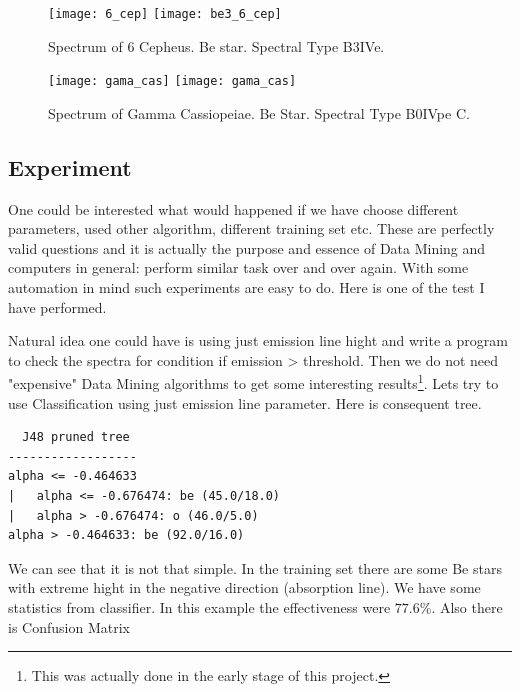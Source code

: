    \begin{figure}[!htbp]
      \begin{center}
        \leavevmode
        \ifpdf
        \texttt{[image: 6\_cep]}
        \else
        \texttt{[image: be3\_6\_cep]}
        \fi
        \caption{Spectrum of 6 Cepheus. Be star. Spectral Type B3IVe.}
        \label{FigBe3}
      \end{center}
    \end{figure}

  \begin{figure}[!htbp]
      \begin{center} 
        \leavevmode
        \ifpdf
        \texttt{[image: gama\_cas]}
        \else
        \texttt{[image: gama\_cas]}
        \fi     
        \caption{Spectrum of Gamma Cassiopeiae. Be Star. Spectral Type
          B0IVpe C.}
        \label{FigBe3}
      \end{center}
    \end{figure}



\clearpage

\subsection{Experiment}

One could be interested what would happened if we have choose
different parameters, used other algorithm, different training set
etc. These are perfectly valid questions and it is actually the purpose
and essence of Data Mining and computers in general: perform similar
task over and over again. With some automation in mind such
experiments are easy to do. Here is one of the test I have performed.

Natural idea one could have is using just emission line hight and
write a program to check the spectra for condition \textrm{if emission
  > threshold}. Then we do not need "expensive" Data Mining algorithms to
get some interesting results\footnote{This was actually done in the early
stage of this project.}. Lets try to use Classification using just
emission line parameter. Here is consequent tree.


\begin{lstlisting}
  J48 pruned tree
------------------
alpha <= -0.464633
|   alpha <= -0.676474: be (45.0/18.0)
|   alpha > -0.676474: o (46.0/5.0)
alpha > -0.464633: be (92.0/16.0)
\end{lstlisting}

We can see that it is not that simple. In the training set there are
some Be stars with extreme hight in the negative direction (absorption
line). We have some statistics from classifier. In this example
the effectiveness were $77.6$\%. Also there is Confusion Matrix 

